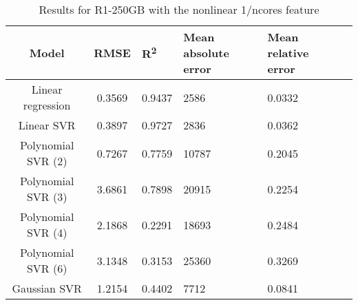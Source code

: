 \begin{table}[H]
\centering
\begin{adjustbox}{center}
\begin{tabular}{c | c M{1.2cm} M{2.5cm} M{2.5cm} M{1.8cm}}
Model & RMSE & R\textsuperscript{2} & Mean absolute error & Mean relative error \tabularnewline
\hline
Linear regression & 0.3569 & 0.9437 &   2586 & 0.0332 \\
Linear SVR & 0.3897 & 0.9727 &   2836 & 0.0362 \\
Polynomial SVR (2) & 0.7267 & 0.7759 &  10787 & 0.2045 \\
Polynomial SVR (3) & 3.6861 & 0.7898 &  20915 & 0.2254 \\
Polynomial SVR (4) & 2.1868 & 0.2291 &  18693 & 0.2484 \\
Polynomial SVR (6) & 3.1348 & 0.3153 &  25360 & 0.3269 \\
Gaussian SVR & 1.2154 & 0.4402 &   7712 & 0.0841 \\
\end{tabular}
\end{adjustbox}
\\
\caption{Results for R1-250GB with the nonlinear 1/ncores feature}
\label{tab:all_nonlinear_R1_250}
\end{table}
